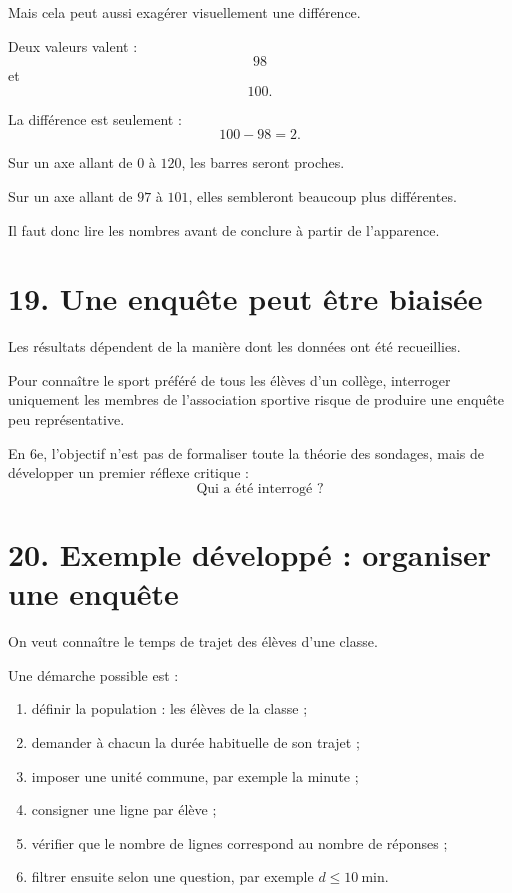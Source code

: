Mais cela peut aussi exagérer visuellement une différence.

\begin{exemple}
Deux valeurs valent :
\[
98
\]
et
\[
100.
\]

La différence est seulement :
\[
100-98=2.
\]

Sur un axe allant de $0$ à $120$, les barres seront proches.

Sur un axe allant de $97$ à $101$, elles sembleront beaucoup plus différentes.
\end{exemple}

Il faut donc lire les nombres avant de conclure à partir de l'apparence.

\section{19. Une enquête peut être biaisée}

Les résultats dépendent de la manière dont les données ont été recueillies.

\begin{exemple}
Pour connaître le sport préféré de tous les élèves d'un collège, interroger uniquement les membres de l'association sportive risque de produire une enquête peu représentative.
\end{exemple}

En 6e, l'objectif n'est pas de formaliser toute la théorie des sondages, mais de développer un premier réflexe critique :
\[
\text{Qui a été interrogé ?}
\]

\section{20. Exemple développé : organiser une enquête}

On veut connaître le temps de trajet des élèves d'une classe.

\begin{methode}
Une démarche possible est :
\begin{enumerate}
\item définir la population : les élèves de la classe ;
\item demander à chacun la durée habituelle de son trajet ;
\item imposer une unité commune, par exemple la minute ;
\item consigner une ligne par élève ;
\item vérifier que le nombre de lignes correspond au nombre de réponses ;
\item filtrer ensuite selon une question, par exemple $d\le10\ \text{min}$.
\end{enumerate}
\end{methode}

